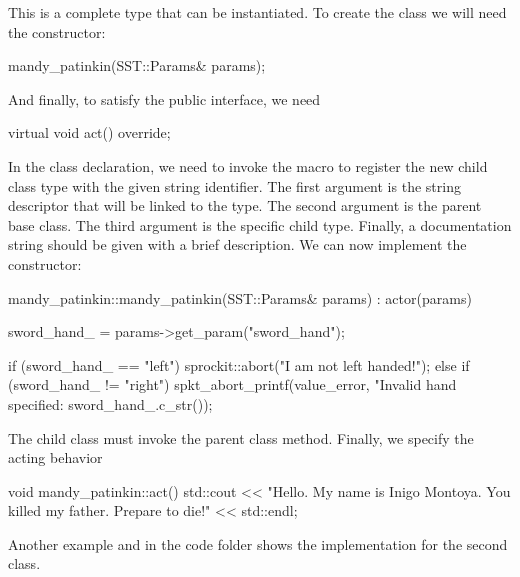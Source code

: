 This is a complete type that can be instantiated. 
To create the class we will need the constructor:

\begin{CppCode}
mandy_patinkin(SST::Params& params);
\end{CppCode}

And finally, to satisfy the  public interface, we need

\begin{CppCode}
virtual void act() override;
\end{CppCode}

In the class declaration, we need to invoke the macro  to register
the new child class type with the given string identifier.
The first argument is the string descriptor that will be linked to the type.
The second argument is the parent base class. 
The third argument is the specific child type.
Finally, a documentation string should be given with a brief description.
We can now implement the constructor:

\begin{CppCode}
mandy_patinkin::mandy_patinkin(SST::Params& params) :
  actor(params)
{
  sword_hand_ = params->get_param("sword_hand");

  if (sword_hand_ == "left"){
    sprockit::abort("I am not left handed!");
  }
  else if (sword_hand_ != "right"){
      spkt_abort_printf(value_error,
          "Invalid hand specified: %
          sword_hand_.c_str());
  }
}
\end{CppCode}
The child class must invoke the parent class method. 
Finally, we specify the acting behavior

\begin{CppCode}
void mandy_patinkin::act()
{
    std::cout << "Hello. My name is Inigo Montoya. You killed my father. Prepare to die!"
              << std::endl;
}
\end{CppCode}

Another example  and  in the code folder shows the implementation for the second class.

